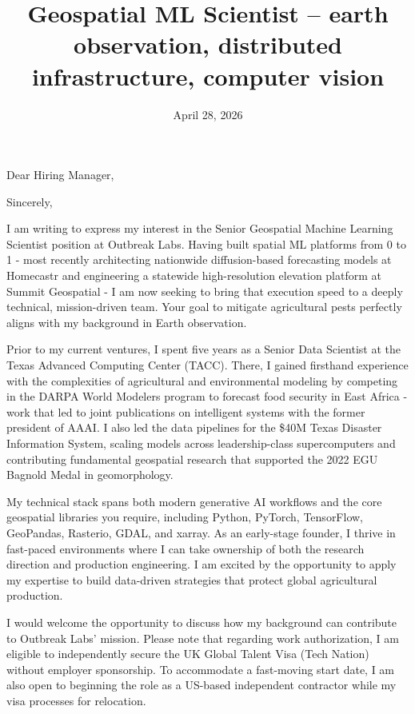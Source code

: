 \documentclass[letterpaper, 10pt,colorlinks,linkcolor=cyan]{moderncv}
\title{\large Geospatial ML Scientist -- earth observation, distributed infrastructure, computer vision}
\begin{document}
  \hypersetup{urlcolor=links}

  \date{April 28, 2026}
  \opening{Dear Hiring Manager,}
  \closing{Sincerely,}
  \makelettertitle

I am writing to express my interest in the Senior Geospatial Machine Learning Scientist position at Outbreak Labs. Having built spatial ML platforms from 0 to 1 - most recently architecting nationwide diffusion-based forecasting models at Homecastr and engineering a statewide high-resolution elevation platform at Summit Geospatial - I am now seeking to bring that execution speed to a deeply technical, mission-driven team. Your goal to mitigate agricultural pests perfectly aligns with my background in Earth observation.

Prior to my current ventures, I spent five years as a Senior Data Scientist at the Texas Advanced Computing Center (TACC). There, I gained firsthand experience with the complexities of agricultural and environmental modeling by competing in the DARPA World Modelers program to forecast food security in East Africa - work that led to joint publications on intelligent systems with the former president of AAAI. I also led the data pipelines for the \$40M Texas Disaster Information System, scaling models across leadership-class supercomputers and contributing fundamental geospatial research that supported the 2022 EGU Bagnold Medal in geomorphology.

My technical stack spans both modern generative AI workflows and the core geospatial libraries you require, including Python, PyTorch, TensorFlow, GeoPandas, Rasterio, GDAL, and xarray. As an early-stage founder, I thrive in fast-paced environments where I can take ownership of both the research direction and production engineering. I am excited by the opportunity to apply my expertise to build data-driven strategies that protect global agricultural production.

I would welcome the opportunity to discuss how my background can contribute to Outbreak Labs' mission. Please note that regarding work authorization, I am eligible to independently secure the UK Global Talent Visa (Tech Nation) without employer sponsorship. To accommodate a fast-moving start date, I am also open to beginning the role as a US-based independent contractor while my visa processes for relocation.
\end{document}
